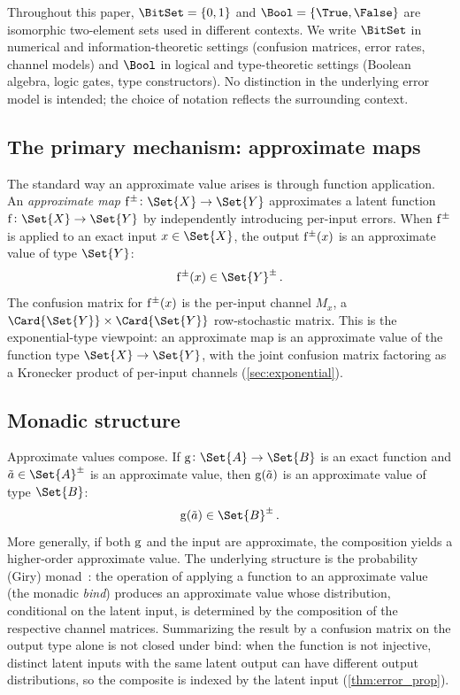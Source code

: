 \documentclass[ ../main.tex]{subfiles}
\begin{document}
\begin{remark}
\label{rem:bitset_bool}
Throughout this paper, $\BitSet = \{0, 1\}$ and $\Bool = \{\True, \False\}$ are isomorphic two-element sets used in different contexts.
We write $\BitSet$ in numerical and information-theoretic settings (confusion matrices, error rates, channel models) and $\Bool$ in logical and type-theoretic settings (Boolean algebra, logic gates, type constructors).
No distinction in the underlying error model is intended; the choice of notation reflects the surrounding context.
\end{remark}

\subsection{The primary mechanism: approximate maps}

The standard way an approximate value arises is through function application.
An \emph{approximate map} $\APFun{f} \colon \Set{X} \to \Set{Y}$ approximates a latent function $\Fun{f} \colon \Set{X} \to \Set{Y}$ by independently introducing per-input errors.
When $\APFun{f}$ is applied to an exact input $x \in \Set{X}$, the output $\APFun{f}(x)$ is an approximate value of type $\Set{Y}$:
\begin{equation}
\APFun{f}(x) \in \AT{\Set{Y}}\,.
\end{equation}
The confusion matrix for $\APFun{f}(x)$ is the per-input channel $M_x$, a $\Card{\Set{Y}} \times \Card{\Set{Y}}$ row-stochastic matrix.
This is the exponential-type viewpoint: an approximate map is an approximate value of the function type $\Set{X} \to \Set{Y}$, with the joint confusion matrix factoring as a Kronecker product of per-input channels (\cref{sec:exponential}).

\subsection{Monadic structure}

Approximate values compose.
If $\Fun{g} \colon \Set{A} \to \Set{B}$ is an exact function and $\tilde{a} \in \AT{\Set{A}}$ is an approximate value, then $\Fun{g}(\tilde{a})$ is an approximate value of type $\Set{B}$:
\begin{equation}
\label{eq:monadic_lift}
\Fun{g}(\tilde{a}) \in \AT{\Set{B}}\,.
\end{equation}
More generally, if both $\Fun{g}$ and the input are approximate, the composition yields a higher-order approximate value.
The underlying structure is the probability (Giry) monad~\cite{giry1982categorical,ramsey2002stochastic}: the operation of applying a function to an approximate value (the monadic \emph{bind}) produces an approximate value whose distribution, conditional on the latent input, is determined by the composition of the respective channel matrices.
Summarizing the result by a confusion matrix on the output type alone is not closed under bind: when the function is not injective, distinct latent inputs with the same latent output can have different output distributions, so the composite is indexed by the latent input (\cref{thm:error_prop}).
\end{document}
